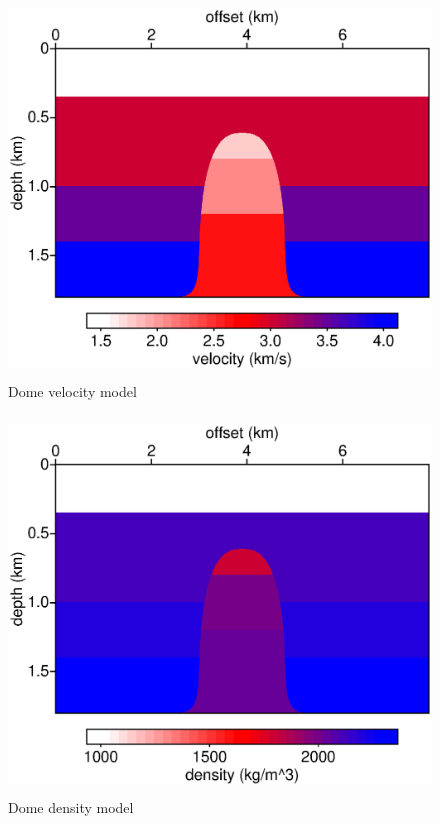 \documentclass [12pt]{georeport}
\begin{document}
\newpage

\begin{figure}
\label{fig1}
\includegraphics[height=10cm,width=15cm]{./Fig/fig1.ps}
\caption{Dome velocity model}
\end{figure}

\begin{figure}
\label{fig2}
\includegraphics[height=10cm,width=15cm]{./Fig/fig2.ps}
\caption{Dome density model}
\end{figure}
\end{document}
